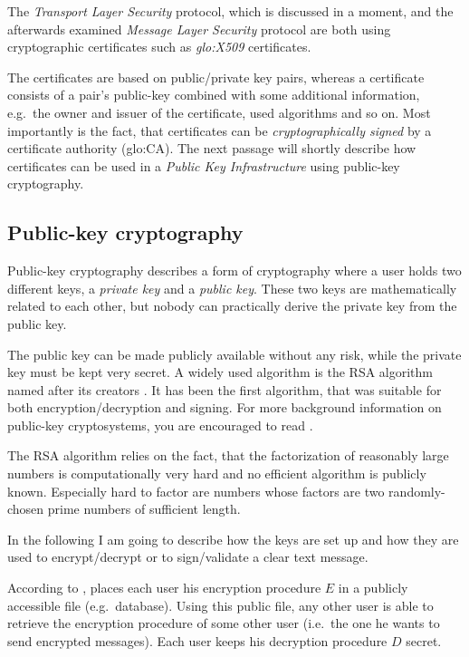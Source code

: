 The  \emph{Transport Layer  Security} protocol,  which is  discussed  in a
moment, and the afterwards examined \emph{Message Layer Security} protocol
are  both using cryptographic  certificates such  as \emph{\gls{glo:X509}}
certificates.

The  certificates  are  based  on  public/private  key  pairs,  whereas  a
certificate consists of a  pair's public-key combined with some additional
information, e.g.~the owner and issuer of the certificate, used algorithms
and  so  on.  Most  importantly  is the  fact,  that  certificates can  be
\emph{cryptographically    signed}     by    a    certificate    authority
(\gls{glo:CA}). The  next passage  will shortly describe  how certificates
can  be  used  in  a  \emph{Public Key  Infrastructure}  using  public-key
cryptography.

\subsection{Public-key cryptography}
\label{sec:fundamentals:public-key}

Public-key  cryptography describes  a form  of cryptography  where  a user
holds  two  different  keys,  a  \emph{private  key}  and  a  \emph{public
  key}.  These two  keys are  mathematically  related to  each other,  but
nobody can practically derive the private key from the public key.

The public key can be made  publicly available without any risk, while the
private key must  be kept very secret. A widely used  algorithm is the RSA
algorithm named  after its  creators \citet*{rivest77method}. It  has been
the first algorithm, that  was suitable for both encryption/decryption and
signing.  For more background information on public-key cryptosystems, you
are encouraged to read \cite{rivest77method,diffie76new}.

The RSA algorithm relies on the fact, that the factorization of reasonably
large numbers is  computationally very hard and no  efficient algorithm is
publicly known.  Especially  hard to factor are numbers  whose factors are
two randomly-chosen prime numbers of sufficient length.

In the following  I am going to describe  how the keys are set  up and how
they are used to encrypt/decrypt or to sign/validate a clear text message.

According  to  \cite{rivest77method},  places  each  user  his  encryption
procedure $E$  in a publicly accessible file  (e.g.~database).  Using this
public file, any  other user is able to  retrieve the encryption procedure
of   some  other   user  (i.e.~the   one  he   wants  to   send  encrypted
messages). Each user keeps his decryption procedure $D$ secret.

